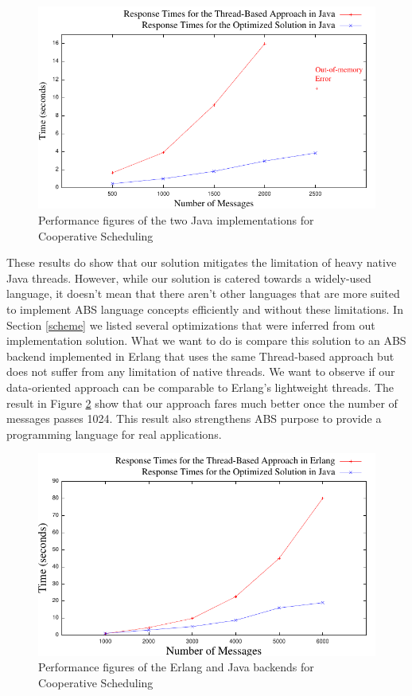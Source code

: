 \begin{figure}
	\label{bench:jj}
	\centering
	\includegraphics[scale=1]{jaj8.pdf}
	\caption{Performance figures of the two Java implementations for Cooperative Scheduling}
\end{figure}

\par These results do show that our solution mitigates the limitation of heavy native Java threads. However, while our solution is catered towards a widely-used language, it doesn't mean that there aren't other languages that are more suited to implement ABS language concepts efficiently and without these limitations. In Section \ref{scheme} we listed several optimizations that were inferred from out implementation solution. What we want to do is compare this solution to an ABS backend implemented in Erlang that uses the same Thread-based approach but does not suffer from any limitation of native threads. We want to observe if our data-oriented approach can be comparable to Erlang's lightweight threads. The result in Figure \ref{bench:ej} show that our approach fares much better once the number of messages passes 1024. This result also strengthens ABS purpose to provide a programming language for real applications.

\begin{figure}
	\label{bench:ej}
	\centering
	\includegraphics[scale=1]{erlj8.pdf}
	\caption{Performance figures of the Erlang and Java backends for Cooperative Scheduling}
\end{figure}



